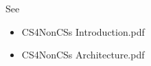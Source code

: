 


\par{
	\noindent See
	\parskip0pt\begin{itemize}
		\item{CS4NonCSs Introduction.pdf}
		\item{CS4NonCSs Architecture.pdf}
	\end{itemize}
}